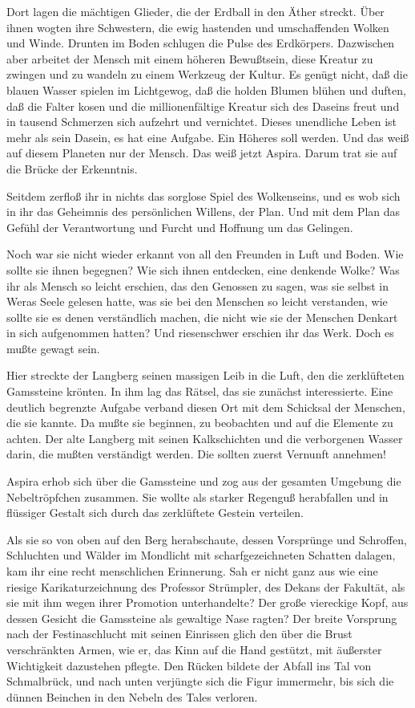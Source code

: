 Dort lagen die mächtigen Glieder, die der Erdball in den Äther
streckt. Über ihnen wogten ihre Schwestern, die ewig hastenden und
umschaffenden Wolken und Winde. Drunten im Boden schlugen die Pulse
des Erdkörpers. Dazwischen aber arbeitet der Mensch mit einem
höheren Bewußtsein, diese Kreatur zu zwingen und zu wandeln zu
einem Werkzeug der Kultur. Es genügt nicht, daß die blauen Wasser
spielen im Lichtgewog, daß die holden Blumen blühen und duften, daß
die Falter kosen und die millionenfältige Kreatur sich des Daseins
freut und in tausend Schmerzen sich aufzehrt und vernichtet. Dieses
unendliche Leben ist mehr als sein Dasein, es hat eine Aufgabe. Ein
Höheres soll werden. Und das weiß auf diesem Planeten nur der
Mensch. Das weiß jetzt Aspira. Darum trat sie auf die Brücke der
Erkenntnis.

Seitdem zerfloß ihr in nichts das sorglose Spiel des Wolkenseins,
und es wob sich in ihr das Geheimnis des persönlichen Willens, der
Plan. Und mit dem Plan das Gefühl der Verantwortung und Furcht und
Hoffnung um das Gelingen.

Noch war sie nicht wieder erkannt von all den Freunden in Luft und
Boden. Wie sollte sie ihnen begegnen? Wie sich ihnen entdecken,
eine denkende Wolke? Was ihr als Mensch so leicht erschien, das den
Genossen zu sagen, was sie selbst in Weras Seele gelesen hatte, was
sie bei den Menschen so leicht verstanden, wie sollte sie es denen
verständlich machen, die nicht wie sie der Menschen Denkart in sich
aufgenommen hatten? Und riesenschwer erschien ihr das Werk. Doch es
mußte gewagt sein.

Hier streckte der Langberg seinen massigen Leib in die Luft, den
die zerklüfteten Gamssteine krönten. In ihm lag das Rätsel, das sie
zunächst interessierte. Eine deutlich begrenzte Aufgabe verband
diesen Ort mit dem Schicksal der Menschen, die sie kannte. Da mußte
sie beginnen, zu beobachten und auf die Elemente zu achten. Der
alte Langberg mit seinen Kalkschichten und die verborgenen Wasser
darin, die mußten verständigt werden. Die sollten zuerst Vernunft
annehmen!

Aspira erhob sich über die Gamssteine und zog aus der gesamten
Umgebung die Nebeltröpfchen zusammen. Sie wollte als starker
Regenguß herabfallen und in flüssiger Gestalt sich durch das
zerklüftete Gestein verteilen.

Als sie so von oben auf den Berg herabschaute, dessen Vorsprünge
und Schroffen, Schluchten und Wälder im Mondlicht mit
scharfgezeichneten Schatten dalagen, kam ihr eine recht
menschlichen Erinnerung. Sah er nicht ganz aus wie eine riesige
Karikaturzeichnung des Professor Strümpler, des Dekans der
Fakultät, als sie mit ihm wegen ihrer Promotion unterhandelte? Der
große viereckige Kopf, aus dessen Gesicht die Gamssteine als
gewaltige Nase ragten? Der breite Vorsprung nach der
Festinaschlucht mit seinen Einrissen glich den über die Brust
verschränkten Armen, wie er, das Kinn auf die Hand gestützt, mit
äußerster Wichtigkeit dazustehen pflegte. Den Rücken bildete der
Abfall ins Tal von Schmalbrück, und nach unten verjüngte sich die
Figur immermehr, bis sich die dünnen Beinchen in den Nebeln des
Tales verloren.

